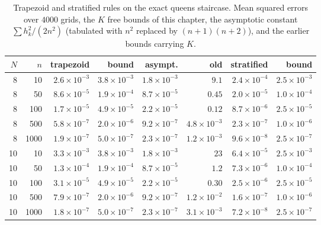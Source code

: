 \begin{table}[t]
\centering
\footnotesize
\caption{Trapezoid and stratified rules on the exact queens staircase. Mean squared errors over $4000$ grids, the $K$ free bounds of this chapter, the asymptotic constant $\sum h_k^2 / (2 n^2)$ (tabulated with $n^2$ replaced by $(n+1)(n+2)$), and the earlier bounds carrying $K$.}
\label{tab:yak2}
\setlength{\tabcolsep}{2.5pt}
\begin{tabular}{rrrrrrrr}
\toprule
$N$ & $n$ & trapezoid & bound & asympt. & old & stratified & bound \\
\midrule
8 & 10 & $2.6 \times 10^{-3}$ & $3.8 \times 10^{-3}$ & $1.8 \times 10^{-3}$ & $9.1$ & $2.4 \times 10^{-4}$ & $2.5 \times 10^{-3}$ \\
8 & 50 & $8.6 \times 10^{-5}$ & $1.9 \times 10^{-4}$ & $8.7 \times 10^{-5}$ & $0.45$ & $2.0 \times 10^{-5}$ & $1.0 \times 10^{-4}$ \\
8 & 100 & $1.7 \times 10^{-5}$ & $4.9 \times 10^{-5}$ & $2.2 \times 10^{-5}$ & $0.12$ & $8.7 \times 10^{-6}$ & $2.5 \times 10^{-5}$ \\
8 & 500 & $5.8 \times 10^{-7}$ & $2.0 \times 10^{-6}$ & $9.2 \times 10^{-7}$ & $4.8 \times 10^{-3}$ & $2.3 \times 10^{-7}$ & $1.0 \times 10^{-6}$ \\
8 & 1000 & $1.9 \times 10^{-7}$ & $5.0 \times 10^{-7}$ & $2.3 \times 10^{-7}$ & $1.2 \times 10^{-3}$ & $9.6 \times 10^{-8}$ & $2.5 \times 10^{-7}$ \\
10 & 10 & $3.3 \times 10^{-3}$ & $3.8 \times 10^{-3}$ & $1.8 \times 10^{-3}$ & $23$ & $6.4 \times 10^{-5}$ & $2.5 \times 10^{-3}$ \\
10 & 50 & $1.3 \times 10^{-4}$ & $1.9 \times 10^{-4}$ & $8.7 \times 10^{-5}$ & $1.2$ & $7.3 \times 10^{-6}$ & $1.0 \times 10^{-4}$ \\
10 & 100 & $3.1 \times 10^{-5}$ & $4.9 \times 10^{-5}$ & $2.2 \times 10^{-5}$ & $0.30$ & $2.5 \times 10^{-6}$ & $2.5 \times 10^{-5}$ \\
10 & 500 & $7.9 \times 10^{-7}$ & $2.0 \times 10^{-6}$ & $9.2 \times 10^{-7}$ & $1.2 \times 10^{-2}$ & $1.6 \times 10^{-7}$ & $1.0 \times 10^{-6}$ \\
10 & 1000 & $1.8 \times 10^{-7}$ & $5.0 \times 10^{-7}$ & $2.3 \times 10^{-7}$ & $3.1 \times 10^{-3}$ & $7.2 \times 10^{-8}$ & $2.5 \times 10^{-7}$ \\
\bottomrule
\end{tabular}
\end{table}

